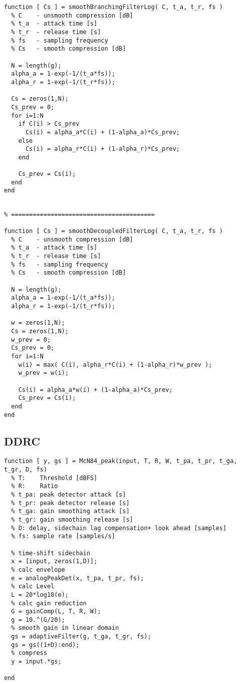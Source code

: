 \documentclass[../main2.tex]{subfiles}
\begin{document}
\begin{lstlisting}[style=customc]
function [ Cs ] = smoothBranchingFilterLog( C, t_a, t_r, fs )
  % C    - unsmooth compression [dB]
  % t_a  - attack time [s]
  % t_r  - release time [s]
  % fs   - sampling frequency
  % Cs   - smooth compression [dB]

  N = length(g);
  alpha_a = 1-exp(-1/(t_a*fs));
  alpha_r = 1-exp(-1/(t_r*fs));
    
  Cs = zeros(1,N);
  Cs_prev = 0;
  for i=1:N
    if C(i) > Cs_prev
      Cs(i) = alpha_a*C(i) + (1-alpha_a)*Cs_prev;
    else
      Cs(i) = alpha_r*C(i) + (1-alpha_r)*Cs_prev;
    end
    
    Cs_prev = Cs(i);
  end
end
\end{lstlisting}
\begin{lstlisting}[style=customc]

% ========================================

function [ Cs ] = smoothDecoupledFilterLog( C, t_a, t_r, fs )
  % C    - unsmooth compression [dB]
  % t_a  - attack time [s]
  % t_r  - release time [s]
  % fs   - sampling frequency 
  % Cs   - smooth compression [dB]

  N = length(g);
  alpha_a = 1-exp(-1/(t_a*fs));
  alpha_r = 1-exp(-1/(t_r*fs));
    
  w = zeros(1,N);
  Cs = zeros(1,N);
  w_prev = 0;
  Cs_prev = 0;
  for i=1:N
    w(i) = max( C(i), alpha_r*C(i) + (1-alpha_r)*w_prev );
    w_prev = w(i);
    
    Cs(i) = alpha_a*w(i) + (1-alpha_a)*Cs_prev;
    Cs_prev = Cs(i);
  end
end
\end{lstlisting}


\subsection{DDRC}
\begin{lstlisting}[style=customc]
function [ y, gs ] = McN84_peak(input, T, R, W, t_pa, t_pr, t_ga, t_gr, D, fs)
  % T:    Threshold [dBFS]
  % R:    Ratio
  % t_pa: peak detector attack [s]
  % t_pr: peak detector release [s]
  % t_ga: gain smoothing attack [s]
  % t_gr: gain smoothing release [s]
  % D: delay, sidechain lag compensation+ look ahead [samples]
  % fs: sample rate [samples/s]

  % time-shift sidechain
  x = [input, zeros(1,D)];
  % calc envelope
  e = analogPeakDet(x, t_pa, t_pr, fs);
  % calc Level
  L = 20*log10(e);
  % calc gain reduction
  G = gainComp(L, T, R, W);
  g = 10.^(G/20);
  % smooth gain in linear domain
  gs = adaptiveFilter(g, t_ga, t_gr, fs);
  gs = gs((1+D):end);
  % compress
  y = input.*gs;
    
end
\end{lstlisting}
\end{document}
